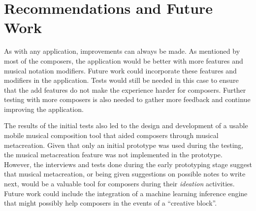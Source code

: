 	\section{Recommendations and Future Work}

		As with any application, improvements can always be made. As mentioned by most of the composers, the application would be better with more features and musical notation modifiers. Future work could incorporate these features and modifiers in the application. Tests would still be needed in this case to ensure that the add features do not make the experience harder for composers. Further testing with more composers is also needed to gather more feedback and continue improving the application. 

		The results of the initial tests also led to the design and development of a usable mobile musical composition tool that aided composers through musical metacreation. Given that only an initial prototype was used during the testing, the musical metacreation feature was not implemented in the prototype. However, the interviews and tests done during the early prototyping stage suggest that musical metacreation, or being given suggestions on possible notes to write next, would be a valuable tool for composers during their \textit{ideation} activities. Future work could include the integration of a machine learning inference engine that might possibly help composers in the events of a ``creative block''.





